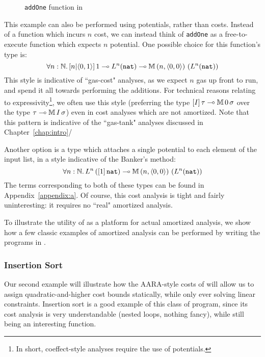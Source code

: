 \begin{figure}
\label{fig:example-dlambdaamor-addone}

\caption{\texttt{addOne} function in \dlambdaamor}
\end{figure}


This example can also be performed using potentials, rather than costs. Instead of a function which incurs $n$ cost, we can instead think of \texttt{addOne} as a free-to-execute function which expects $n$ potential. One possible choice for this function's type is:
$$\forall n : \mathbb{N} .\, [n|\langle 0,1 \rangle] \, 1 \multimap L^n(\texttt{nat}) \multimap \mathbb{M} \, (n,\langle 0,0 \rangle) \, \left(L^n(\texttt{nat})\right)$$
This style is indicative of ``gas-cost" analyses, as we expect $n$ gas up front to run, and spend it all towards performing the additions. For technical reasons relating to expressivity\footnote{
In short, coeffect-style analyses require the use of potentials.
}, we often use this style (preferring the type $[I] \, \tau \multimap \mathbb{M} \, 0 \, \sigma$ over the type $\tau \multimap \mathbb{M} \, I \, \sigma$) even in cost analyses which are not amortized. Note that this pattern is indicative of the ``gas-tank" analyses discussed in Chapter~\ref{chap:intro}/

Another option is a type which attaches a single potential to each element of the input list, in a style indicative of the Banker's method:
$$
\forall n : \mathbb{N} .\, L^n\left([1] \, \texttt{nat}\right) \multimap \mathbb{M} \, (n,\langle 0,0 \rangle) \, \left(L^n(\texttt{nat})\right)
$$
The terms corresponding to both of these types can be found in Appendix~\ref{appendix:a}. Of course, this cost analysis is tight and fairly uninteresting: it requires no ``real" amortized analysis.

To illustrate the utility of \dlambdaamor as a platform for actual amortized analysis, we show how a few classic examples of amortized analysis can be performed by writing the programs in \dlambdaamor.

\subsubsection{Insertion Sort}
Our second example will illustrate how the AARA-style costs of \dlambdaamor will allow us to assign quadratic-and-higher cost bounds statically, while only ever solving linear constraints. Insertion sort is a good example of this class of program, since its cost analysis is very understandable (nested loops, nothing fancy), while still being an interesting function.

